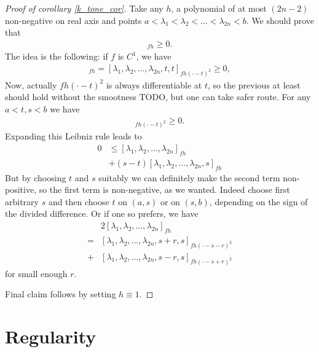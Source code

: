 \begin{proof}[Proof of corollary \ref{k_tone_cor}]
	Take any $h$, a polynomial of at most $(2 n - 2)$ non-negative on real axis and points $a < \lambda_{1} < \lambda_{2} < \ldots < \lambda_{2 n} < b$. We should prove that
	\begin{align*}
		[\lambda_{1}, \lambda_{2}, \ldots, \lambda_{2 n}]_{f h} \geq 0.
	\end{align*}
	The idea is the following: if $f$ is $C^{1}$, we have
	\begin{align*}
		[\lambda_{1}, \lambda_{2}, \ldots, \lambda_{2 n}]_{f h} = [\lambda_{1}, \lambda_{2}, \ldots, \lambda_{2 n}, t, t]_{f h (\cdot - t)^2} \geq 0,
	\end{align*}
	Now, actually $f h (\cdot - t)^2$ is always differentiable at $t$, so the previous at least should hold without the smootness TODO, but one can take safer route.
	For any $a < t, s < b$ we have
	\begin{align*}
		[\lambda_{1}, \lambda_{2}, \ldots, \lambda_{2 n}, t, s]_{f h (\cdot - t)^2} \geq 0.
	\end{align*}
	Expanding this Leibniz rule leads to
	\begin{align*}
		0 &\leq [\lambda_{1}, \lambda_{2}, \ldots, \lambda_{2 n}]_{f h} \\
		&+ (s - t) [\lambda_{1}, \lambda_{2}, \ldots, \lambda_{2 n}, s]_{f h}
	\end{align*}
	But by choosing $t$ and $s$ suitably we can definitely make the second term non-positive, so the first term is non-negative, as we wanted. Indeed choose first arbitrary $s$ and then choose $t$ on $(a, s)$ or on $(s, b)$, depending on the sign of the divided difference. Or if one so prefers, we have
	\begin{align*}
		& 2 [\lambda_{1}, \lambda_{2}, \ldots, \lambda_{2 n}]_{f h} \\
		=& [\lambda_{1}, \lambda_{2}, \ldots, \lambda_{2 n}, s + r, s]_{f h (\cdot - s - r)^2} \\
		+& [\lambda_{1}, \lambda_{2}, \ldots, \lambda_{2 n}, s - r, s]_{f h (\cdot - s + r)^2}
	\end{align*}
	for small enough $r$.

	Final claim follows by setting $h \equiv 1$.
\end{proof}

\section{Regularity}

